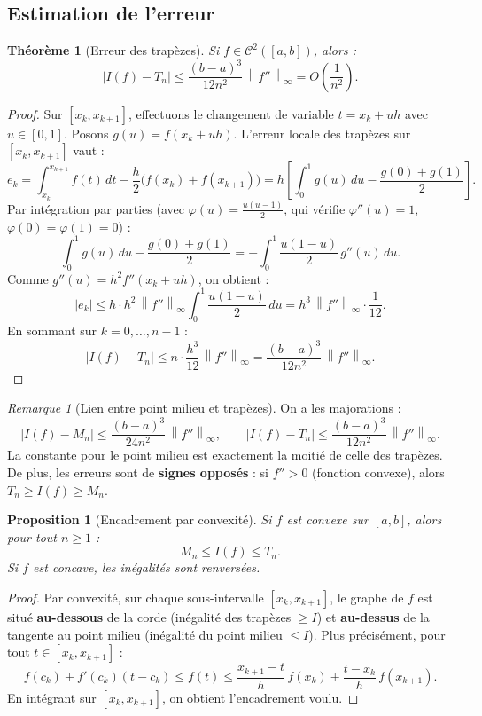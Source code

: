\documentclass[a4paper,12pt]{article}
\theoremstyle{definition}
\theoremstyle{plain}
\newtheorem{theoreme}{Théorème}[section]
\newtheorem{proposition}{Proposition}[section]
\theoremstyle{remark}
\newtheorem{remarque}{Remarque}[section]
\newcommand{\abs}[1]{\left|#1\right|}
\newcommand{\norme}[1]{\left\|#1\right\|_\infty}
\begin{document}
\subsection{Estimation de l'erreur}

\begin{theoreme}[Erreur des trapèzes]\label{thm:erreur_trapezes}
Si $f \in \mathcal{C}^2([a,b])$, alors :
\[
  \abs{I(f) - T_n} \leq \frac{(b-a)^3}{12n^2}\,\norme{f''} = O\!\left(\frac{1}{n^2}\right).
\]
\end{theoreme}

\begin{proof}
Sur $[x_k, x_{k+1}]$, effectuons le changement de variable $t = x_k + uh$ avec $u \in [0,1]$. Posons $g(u) = f(x_k + uh)$. L'erreur locale des trapèzes sur $[x_k, x_{k+1}]$ vaut :
\[
  e_k = \int_{x_k}^{x_{k+1}} f(t)\,dt - \frac{h}{2}\big(f(x_k) + f(x_{k+1})\big) = h\left[\int_0^1 g(u)\,du - \frac{g(0)+g(1)}{2}\right].
\]
Par intégration par parties (avec $\varphi(u) = \frac{u(u-1)}{2}$, qui vérifie $\varphi''(u) = 1$, $\varphi(0) = \varphi(1) = 0$) :
\[
  \int_0^1 g(u)\,du - \frac{g(0)+g(1)}{2} = -\int_0^1 \frac{u(1-u)}{2}\,g''(u)\,du.
\]
Comme $g''(u) = h^2 f''(x_k + uh)$, on obtient :
\[
  |e_k| \leq h \cdot h^2\,\norme{f''}\int_0^1 \frac{u(1-u)}{2}\,du = h^3\,\norme{f''}\cdot\frac{1}{12}.
\]
En sommant sur $k = 0, \ldots, n-1$ :
\[
  \abs{I(f) - T_n} \leq n\cdot\frac{h^3}{12}\,\norme{f''} = \frac{(b-a)^3}{12n^2}\,\norme{f''}.
\]
\end{proof}

\begin{remarque}[Lien entre point milieu et trapèzes]
On a les majorations :
\[
  \abs{I(f) - M_n} \leq \frac{(b-a)^3}{24n^2}\,\norme{f''}, \qquad
  \abs{I(f) - T_n} \leq \frac{(b-a)^3}{12n^2}\,\norme{f''}.
\]
La constante pour le point milieu est exactement la moitié de celle des trapèzes. De plus, les erreurs sont de \textbf{signes opposés} : si $f'' > 0$ (fonction convexe), alors $T_n \geq I(f) \geq M_n$.
\end{remarque}

\begin{proposition}[Encadrement par convexité]
Si $f$ est convexe sur $[a,b]$, alors pour tout $n \geq 1$ :
\[
  M_n \leq I(f) \leq T_n.
\]
Si $f$ est concave, les inégalités sont renversées.
\end{proposition}

\begin{proof}
Par convexité, sur chaque sous-intervalle $[x_k, x_{k+1}]$, le graphe de $f$ est situé \textbf{au-dessous} de la corde (inégalité des trapèzes $\geq I$) et \textbf{au-dessus} de la tangente au point milieu (inégalité du point milieu $\leq I$). Plus précisément, pour tout $t \in [x_k, x_{k+1}]$ :
\[
  f(c_k) + f'(c_k)(t - c_k) \leq f(t) \leq \frac{x_{k+1}-t}{h}\,f(x_k) + \frac{t - x_k}{h}\,f(x_{k+1}).
\]
En intégrant sur $[x_k, x_{k+1}]$, on obtient l'encadrement voulu.
\end{proof}
\end{document}
